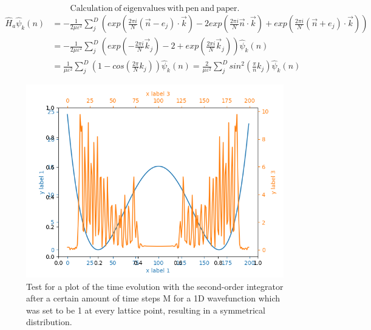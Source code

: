\documentclass[11pt, letterpaper, onecolumn]{article}
\begin{document}
	 
 	\begin{equation}	
  	\mathrm{Calculation~of~eigenvalues~with~pen~and~paper.}
  	\label{equ:calc-eigenvectors}
  	\end{equation} 
	\begin{align*}
    \hat{H}_a\hat{\psi}_k(n)&=-\frac{1}{2\mu\varepsilon^2}\sum\limits_j^D\left(exp\left(\frac{2\pi i}{N}(\Vec{n}-e_j)\cdot\Vec{k} \right) -2exp\left(\frac{2\pi i}{N}\Vec{n}\cdot\Vec{k} \right) +exp\left(\frac{2\pi i}{N}(\Vec{n}+e_j)\cdot\Vec{k} \right) \right)\\
    &=-\frac{1}{2\mu\varepsilon^2}\sum\limits_j^D\left(exp\left(-\frac{2\pi i}{N}\Vec{k}_j \right) -2 +exp\left(\frac{2\pi i}{N}\Vec{k}_j \right) \right)\hat{\psi}_k(n)\\
    &=\frac{1}{\mu\varepsilon^2}\sum\limits_j^D\left(1-cos\left(\frac{2\pi}{N}k_j\right)\right)\hat{\psi}_k(n)=\frac{2}{\mu\varepsilon^2}\sum\limits_j^Dsin^2\left(\frac{\pi}{n}k_j \right)\hat{\psi}_k(n)
	\end{align*}
	\vspace{1cm}
	
	\begin{figure} [h] 
	\begin{center}
	\includegraphics[width=16cm]{"animation-so-integratorEND.png
"}
	\caption{Test for a plot of the time evolution with the second-order integrator after a certain amount of time steps M for a 1D wavefunction which was set to be 1 at every lattice point, resulting in a symmetrical distribution.}
		\label{fig:1D-so_integr}
	\end{center}
	\end{figure}
    
	


	

	
	





	
\end{document}
